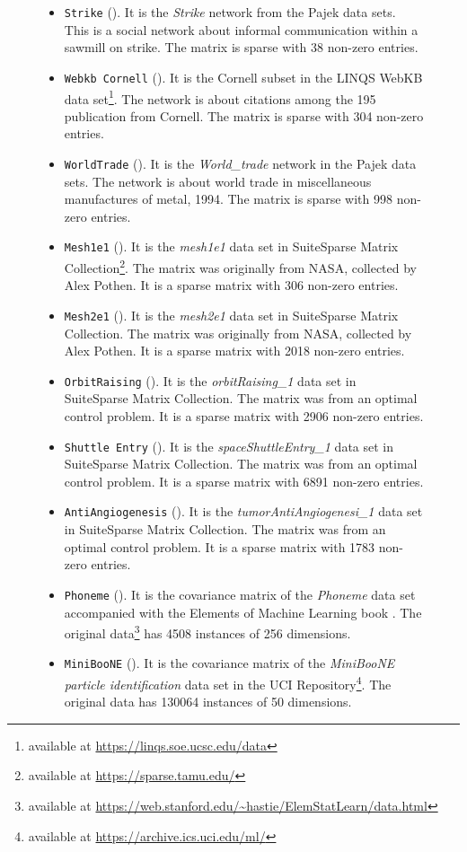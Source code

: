 \documentclass{article}
\begin{document}
\begin{figure}[t]
\begin{center}
\begin{itemize}
    \item \texttt{Strike} (). It is the \emph{Strike} network from the Pajek data sets. This is a social network about informal communication within a sawmill on strike. The matrix is sparse with 38 non-zero entries.
    \item \texttt{Webkb Cornell} (). It is the Cornell subset in the LINQS WebKB data set\footnote{available at \url{https://linqs.soe.ucsc.edu/data}}. The network is about citations among the 195 publication from Cornell. The matrix is sparse with 304 non-zero entries.
    \item \texttt{WorldTrade} (). It is the \emph{World\_trade} network in the Pajek data sets. The network is about world trade in miscellaneous manufactures of metal, 1994. The matrix is sparse with 998 non-zero entries.
    \item \texttt{Mesh1e1} (). It is the \emph{mesh1e1} data set in SuiteSparse Matrix Collection\footnote{available at \url{https://sparse.tamu.edu/}}. The matrix was originally from NASA, collected by Alex Pothen. It is a sparse matrix with 306 non-zero entries.
    \item \texttt{Mesh2e1} (). It is the \emph{mesh2e1} data set in SuiteSparse Matrix Collection. The matrix was originally from NASA, collected by Alex Pothen. It is a sparse matrix with 2018 non-zero entries.
    \item \texttt{OrbitRaising} (). It is the \emph{orbitRaising\_1} data set in SuiteSparse Matrix Collection. The matrix was from an optimal control problem. It is a sparse matrix with 2906 non-zero entries.
    \item \texttt{Shuttle Entry} (). It is the \emph{spaceShuttleEntry\_1} data set in SuiteSparse Matrix Collection. The matrix was from an optimal control problem. It is a sparse matrix with 6891 non-zero entries.
    \item \texttt{AntiAngiogenesis} (). It is the \emph{tumorAntiAngiogenesi\_1} data set in SuiteSparse Matrix Collection. The matrix was from an optimal control problem. It is a sparse matrix with 1783 non-zero entries.
    \item \texttt{Phoneme} (). It is the covariance matrix of the \emph{Phoneme} data set accompanied with the Elements of Machine Learning book \citep{hastie01statisticallearning}. The original data\footnote{available at \url{https://web.stanford.edu/~hastie/ElemStatLearn/data.html}} has 4508 instances of 256 dimensions.
    \item \texttt{MiniBooNE} (). It is the covariance matrix of the \emph{MiniBooNE particle identification} data set in the UCI Repository\footnote{available at \url{https://archive.ics.uci.edu/ml/}}. The original data has 130064 instances of 50 dimensions.

\end{itemize}
\end{center}
\end{figure}
\end{document}
